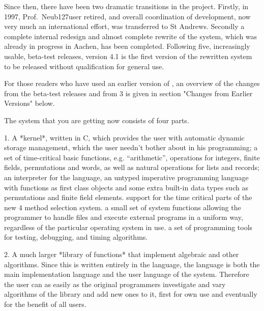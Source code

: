 Since then,  there  have  been  two  dramatic transitions in  the  {\GAP}
project.  Firstly,    in  1997, Prof.~Neub\accent127user   retired,   and overall
coordination of {\GAP}  development,   now  very much   an  international
effort, was transferred  to  St Andrews.   Secondly  a complete  internal
redesign and almost complete rewrite of the  system, which was already in
progress in Aachen,  has  been completed.  Following  five, increasingly
usable,   beta-test releases, version  4.1 is  the  first  version of the
rewritten system to be released without qualification for general use. 

For those readers who have used an earlier version of {\GAP}, an overview
of the changes from the beta-test releases and from {\GAP} 3 is given in
section "Changes from Earlier Versions" below.

The system that you are getting now consists of four parts.
\beginlist
  \item{1.}
    A  *kernel*, written in C, which provides the user with
    \itemitem{-}
      automatic dynamic storage management, which the user needn't bother
      about in his programming;
    \itemitem{-}
      a   set of  time-critical basic   functions, e.g.   ``arithmetic'',
      operations for integers, finite fields,  permutations and words, as
      well as natural operations for lists and records;
    \itemitem{-} 
      an interpreter   for  the {\GAP} language,    an untyped
      imperative programming language with functions as first class objects
      and some extra built-in data types such as permutations and finite
      field elements. 
    \itemitem{-}
      support for the time critical parts of the new {\GAP}4 method
      selection system.
    \itemitem{-}
      a small set of system functions allowing the {\GAP} programmer to handle
      files and execute external programs in a uniform way, regardless of 
      the particular operating system in use. 
    \itemitem{-}
      a   set  of programming tools  for   testing, debugging, and timing
      algorithms.

  \item{2.}
    A   much larger *library of    {\GAP} functions* that implement algebraic
    and other algorithms.  Since  this is written entirely in
    the  {\GAP} language, the  {\GAP}    language   is both   the  main
    implementation language   and  the  user  language of   the   system.
    Therefore  the  user can    as easily  as  the  original  programmers
    investigate  and vary algorithms of  the library and  add new ones to
    it, first for own  use and eventually for  the benefit of  all {\GAP}
    users.  

